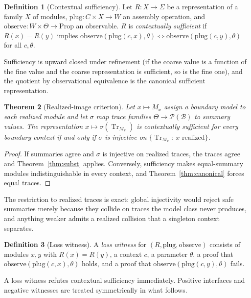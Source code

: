 \documentclass[11pt,a4paper]{article}
\theoremstyle{plain}
\newtheorem{theorem}{Theorem}[section]
\theoremstyle{definition}
\newtheorem{definition}[theorem]{Definition}
\theoremstyle{remark}
\newcommand{\Tr}{\operatorname{Tr}}
\begin{document}
\begin{definition}[Contextual sufficiency]
Let $R:X\to\Sigma$ be a representation of a family $X$ of modules, $\mathrm{plug}:C\times X\to W$ an assembly operation, and $\mathrm{observe}:W\times\Theta\to\mathrm{Prop}$ an observable. $R$ is \emph{contextually sufficient} if $R(x)=R(y)$ implies $\mathrm{observe}(\mathrm{plug}(c,x),\theta)\Leftrightarrow\mathrm{observe}(\mathrm{plug}(c,y),\theta)$ for all $c,\theta$.
\end{definition}

Sufficiency is upward closed under refinement (if the coarse value is a function of the fine value and the coarse representation is sufficient, so is the fine one), and the quotient by observational equivalence is the canonical sufficient representation.

\begin{theorem}[Realized-image criterion]\label{thm:realized}
Let $x\mapsto M_x$ assign a boundary model to each realized module and let $\sigma$ map trace families $\Theta\to\mathcal P(\mathcal B)$ to summary values. The representation $x\mapsto\sigma(\Tr_{M_x})$ is contextually sufficient for every boundary context if and only if $\sigma$ is injective on $\{\Tr_{M_x}:\ x\text{ realized}\}$.
\end{theorem}
\begin{proof}
If summaries agree and $\sigma$ is injective on realized traces, the traces agree and Theorem~\ref{thm:subst} applies. Conversely, sufficiency makes equal-summary modules indistinguishable in every context, and Theorem~\ref{thm:canonical} forces equal traces.
\end{proof}

The restriction to realized traces is exact: global injectivity would reject safe summaries merely because they collide on traces the model class never produces, and anything weaker admits a realized collision that a singleton context separates.

\begin{definition}[Loss witness]
A \emph{loss witness} for $(R,\mathrm{plug},\mathrm{observe})$ consists of modules $x,y$ with $R(x)=R(y)$, a context $c$, a parameter $\theta$, a proof that $\mathrm{observe}(\mathrm{plug}(c,x),\theta)$ holds, and a proof that $\mathrm{observe}(\mathrm{plug}(c,y),\theta)$ fails.
\end{definition}
A loss witness refutes contextual sufficiency immediately. Positive interfaces and negative witnesses are treated symmetrically in what follows.
\end{document}
